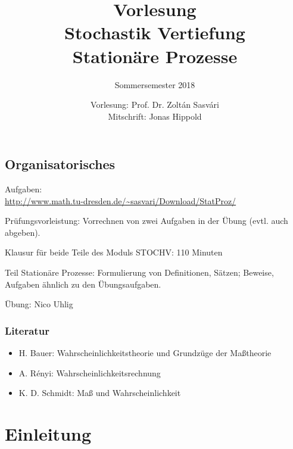 \documentclass[
 a4paper,
 12pt,
 parskip=half
 ]{scrreprt}
\title{%
  Vorlesung\\
  Stochastik Vertiefung\\
  Stationäre Prozesse
}
\subtitle{Sommersemester 2018}
\author{Vorlesung: Prof. Dr. Zoltán Sasvári\\Mitschrift: Jonas Hippold}
\theoremstyle{plain}
\theoremstyle{definition}
\numberwithin{equation}{section}
\begin{document}
\maketitle

\tableofcontents

\clearpage

\section*{Organisatorisches}
Aufgaben:\\
\url{http://www.math.tu-dresden.de/~sasvari/Download/StatProz/}

Prüfungsvorleistung: Vorrechnen von zwei Aufgaben in der Übung (evtl. auch
abgeben). 

Klausur für beide Teile des Moduls STOCHV: 110 Minuten

Teil Stationäre Prozesse: Formulierung von Definitionen, Sätzen; Beweise,
Aufgaben ähnlich zu den Übungsaufgaben.

Übung: Nico Uhlig

\subsection*{Literatur}
\begin{itemize}
\item H. Bauer: Wahrscheinlichkeitstheorie und Grundzüge der Maßtheorie
\item A. Rényi: Wahrscheinlichkeitsrechnung
\item K. D. Schmidt: Maß und Wahrscheinlichkeit
\end{itemize}

\chapter{Einleitung}
\end{document}
